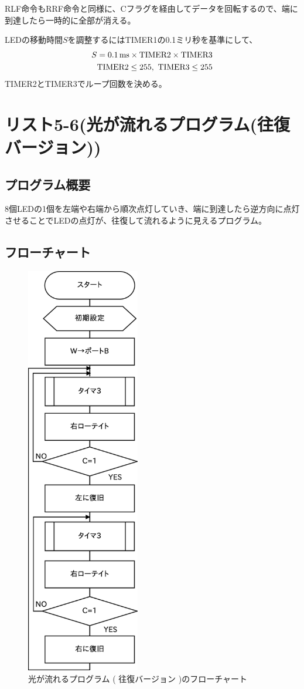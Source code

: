\documentclass[a4paper,12pt]{ujarticle}
\begin{document}
      RLF命令もRRF命令と同様に、Cフラグを経由してデータを回転するので、端に到達したら一時的に全部が消える。

      LEDの移動時間$S$を調整するにはTIMER1の0.1ミリ秒を基準にして、
      \begin{eqnarray*}
       S = \SI{0.1}{\milli\second} \times {\rm TIMER2 \times TIMER3} \\
       {\rm TIMER2 \le 255},\ 
       {\rm TIMER3 \le 255}
      \end{eqnarray*}
      TIMER2とTIMER3でループ回数を決める。
 \clearpage
 \section{リスト5-6(光が流れるプログラム(往復バージョン))}
  \subsection{プログラム概要}
  8個LEDの1個を左端や右端から順次点灯していき、端に到達したら逆方向に点灯させることでLEDの点灯が、往復して流れるように見えるプログラム。
  \subsection{フローチャート}
  \begin{figure}[htbp]
   \begin{center}
    \includegraphics[height=180mm]{Diagram5-6.eps}
   \end{center}
   \caption{光が流れるプログラム ( 往復バージョン )のフローチャート}
   \label{fig}
  \end{figure}
  \clearpage
\end{document}
